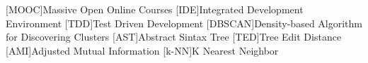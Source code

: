 \begin{acronym}
	[MOOC]{Massive Open Online Courses}
	[IDE]{Integrated Development Environment}
	[TDD]{Test Driven Development}
	[DBSCAN]{Density-based Algorithm for Discovering Clusters}
	[AST]{Abstract Sintax Tree}
	[TED]{Tree Edit Distance}
	[AMI]{Adjusted Mutual Information}
	[k-NN]{K Nearest Neighbor}
	
\end{acronym}